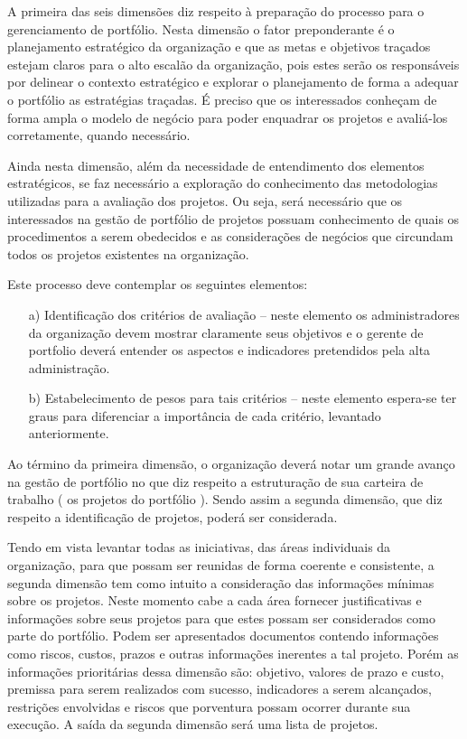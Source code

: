 \documentclass[a4paper,10pt]{article}
\begin{document}
\flushleft
A primeira das seis dimensões diz respeito à preparação do processo para o gerenciamento de portfólio. Nesta dimensão o fator preponderante  
é o planejamento estratégico da organização e que as metas e objetivos traçados estejam claros para o alto escalão da organização, 
pois estes serão os responsáveis por delinear o contexto estratégico e explorar o planejamento de forma a adequar o portfólio as estratégias traçadas. 
É preciso que os interessados conheçam de forma ampla o modelo de negócio para poder enquadrar os projetos e avaliá-los
corretamente, quando necessário.\cite{rabechini}

\flushleft
Ainda nesta dimensão, além da necessidade de entendimento dos elementos estratégicos, se faz necessário
a exploração do conhecimento das metodologias utilizadas para a avaliação dos projetos. Ou seja, será necessário
que os interessados na gestão de portfólio de projetos possuam conhecimento de quais os procedimentos a serem obedecidos
e as considerações de negócios que circundam todos os projetos existentes na organização.

Este processo deve contemplar os seguintes elementos:\cite{rabechini}

\begin{itemize}
 \item[a)] Identificação dos critérios de avaliação – neste elemento
os administradores da organização devem mostrar claramente seus objetivos e o gerente de portfolio deverá
entender os aspectos e indicadores pretendidos pela alta
administração.
\item[b)] Estabelecimento de pesos para tais critérios – neste elemento espera-se ter graus para diferenciar a importância
de cada critério, levantado anteriormente.
\end{itemize}

\flushleft
Ao término da primeira dimensão, o organização deverá notar um grande avanço na gestão de portfólio no que diz respeito
a estruturação de sua carteira de trabalho ( os projetos do portfólio ). Sendo assim a segunda dimensão, que diz respeito a 
identificação de projetos, poderá ser considerada.

\flushleft
Tendo em vista levantar todas as iniciativas, das áreas individuais da organização, para
que possam ser reunidas de forma coerente e consistente, a segunda dimensão tem como intuito a consideração
das informações mínimas sobre os projetos. Neste momento cabe a cada área fornecer justificativas e informações
sobre seus projetos para que estes possam ser considerados como parte do portfólio. Podem ser apresentados documentos
contendo informações como riscos, custos, prazos e outras informações inerentes a tal projeto. Porém as informações prioritárias
dessa dimensão são: objetivo, valores de prazo e custo, premissa para serem realizados com sucesso, indicadores a serem alcançados, 
restrições envolvidas e riscos que porventura possam ocorrer durante sua execução. A saída da segunda dimensão será uma lista de projetos.
\end{document}

